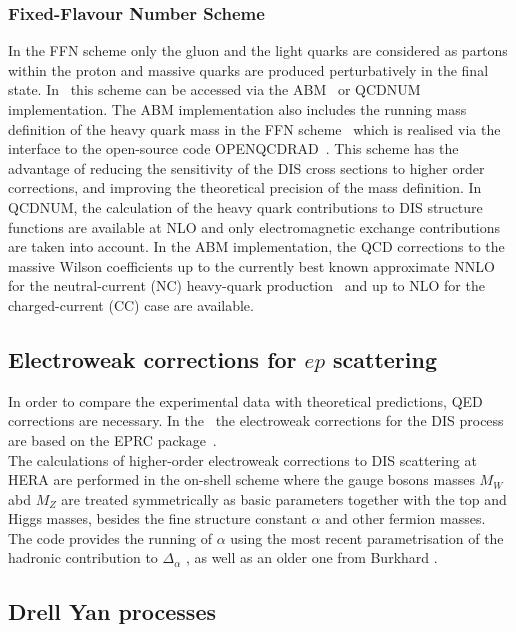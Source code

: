 \subsubsection {Fixed-Flavour Number Scheme}

In the FFN scheme only the gluon and the light quarks are considered
as partons within the proton and massive quarks are produced perturbatively in the final state.
In \fitter\ this scheme can be accessed via the ABM~\cite{openqcdrad:page} or
QCDNUM implementation.
The ABM implementation also includes the running mass definition of the heavy quark mass 
in the FFN scheme~\cite{Alekhin:runm} which is realised via the interface to the 
open-source code OPENQCDRAD~\cite{openqcdrad:page}.
This scheme has the advantage of reducing the sensitivity of the DIS cross sections to
higher order corrections, and improving the theoretical precision of the mass definition. 
In QCDNUM, the calculation of the heavy quark contributions to DIS structure functions
are available at NLO and only electromagnetic exchange contributions are taken into account.
In the ABM implementation, the QCD corrections to the massive Wilson coefficients 
up to the currently best known approximate NNLO for the neutral-current (NC) 
heavy-quark production~\cite{SMoch:npb864} and up to NLO
for the charged-current (CC) case are available.
%
%       
\subsection{Electroweak corrections for \texorpdfstring{$ep$}{ep} scattering} 
 
In order to compare the experimental data with theoretical predictions, 
QED corrections are necessary. In the \fitter\, the electroweak corrections 
for the DIS process are based on the EPRC package~\cite{SpiesbergerPrivComm}.
\\
The calculations of higher-order electroweak corrections to DIS scattering at HERA are performed
in the on-shell scheme where the gauge bosons masses $M_W$ abd $M_Z$ are treated symmetrically
as basic parameters together with the top and Higgs masses, besides the fine structure constant 
$\alpha$ and other fermion masses.
\\
The code provides the running of $\alpha$ using the most recent parametrisation
of the hadronic contribution to $\Delta_\alpha$ \cite{Jegerlehner}, as well as an older 
one from Burkhard \cite{Burkhard}.

\subsection{Drell Yan processes}

